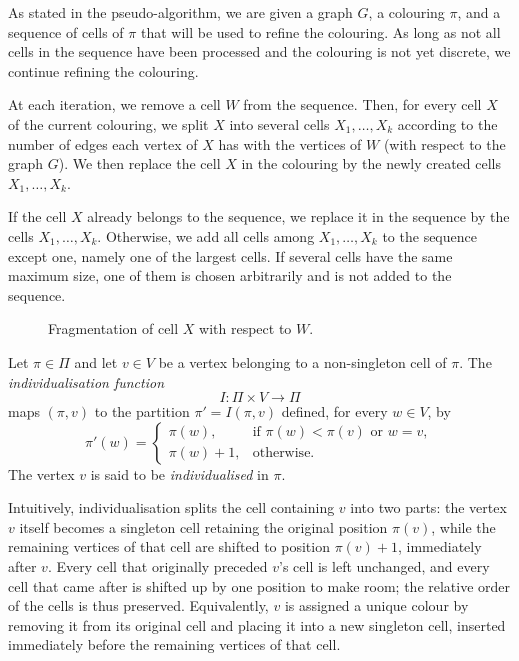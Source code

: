   As stated in the pseudo-algorithm, we are given a graph $G$, a colouring $\pi$, and a sequence of cells of $\pi$ that will be used to refine the colouring. As long as not all cells in the sequence have been processed and the colouring is not yet discrete, we continue refining the colouring.
  
  At each iteration, we remove a cell $W$ from the sequence. Then, for every cell $X$ of the current colouring, we split $X$ into several cells $X_1, \ldots, X_k$ according to the number of edges each vertex of $X$ has with the vertices of $W$ (with respect to the graph $G$). We then replace the cell $X$ in the colouring by the newly created cells $X_1, \ldots, X_k$.
  
  If the cell $X$ already belongs to the sequence, we replace it in the sequence by the cells $X_1, \ldots, X_k$. Otherwise, we add all cells among $X_1, \ldots, X_k$ to the sequence except one, namely one of the largest cells. If several cells have the same maximum size, one of them is chosen arbitrarily and is not added to the sequence.

  \begin{figure}[ht]
    \centering
    
    \caption{Fragmentation of cell $X$ with respect to $W$.}\label{fig:refinement}
  \end{figure}


  \vspace{1em}

  \newpage
  
  \begin{definition}[Individualisation]\label{def:individualised_function}
    Let $\pi \in \Pi$ and let $v \in V$ be a vertex belonging to a non-singleton cell of $\pi$.
    The \emph{individualisation function}
    \[
    I : \Pi \times V \to \Pi
    \]
    maps $(\pi,v)$ to the partition $\pi' = I(\pi,v)$ defined, for every $w \in V$, by
    \[
    \pi'(w)=
    \begin{cases}
    \pi(w), & \text{if } \pi(w) < \pi(v) \text{ or } w=v, \\
    \pi(w)+1, & \text{otherwise}.
    \end{cases}
    \]
    The vertex $v$ is said to be \emph{individualised} in $\pi$.
    \end{definition}

  Intuitively, individualisation splits the cell containing $v$ into two parts: the vertex $v$ 
  itself becomes a singleton cell retaining the original position $\pi(v)$, while the remaining 
  vertices of that cell are shifted to position $\pi(v)+1$, immediately after $v$. Every cell 
  that originally preceded $v$'s cell is left unchanged, and every cell that came after is 
  shifted up by one position to make room; the relative order of the cells is thus preserved. Equivalently, $v$ is assigned a unique colour by removing it from its original cell and placing it into a new singleton cell, inserted immediately before the remaining vertices of that cell.



